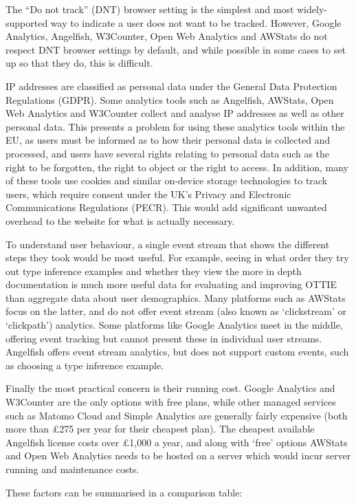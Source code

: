 \documentclass[a4paper,fleqn,oneside,12pt]{report}
\begin{document}
The ``Do not track'' (DNT) browser setting is the simplest and most widely-supported way to indicate a user does not want to be tracked. However, Google Analytics, Angelfish, W3Counter, Open Web Analytics and AWStats do not respect DNT browser settings by default, and while possible in some cases to set up so that they do, this is difficult.

IP addresses are classified as personal data under the General Data Protection Regulations (GDPR). Some analytics tools such as Angelfish, AWStats, Open Web Analytics and W3Counter collect and analyse IP addresses as well as other personal data. This presents a problem for using these analytics tools within the EU, as users must be informed as to how their personal data is collected and processed, and users have several rights relating to personal data such as the right to be forgotten, the right to object or the right to access. In addition, many of these tools use cookies and similar on-device storage technologies to track users, which require consent under the UK’s Privacy and Electronic Communications Regulations (PECR). This would add significant unwanted overhead to the website for what is actually necessary.

To understand user behaviour, a single event stream that shows the different steps they took would be most useful. For example, seeing in what order they try out type inference examples and whether they view the more in depth documentation is much more useful data for evaluating and improving OTTIE than aggregate data about user demographics. Many platforms such as AWStats focus on the latter, and do not offer event stream (also known as `clickstream' or `clickpath') analytics. Some platforms like Google Analytics meet in the middle, offering event tracking but cannot present these in individual user streams. Angelfish offers event stream analytics, but does not support custom events, such as choosing a type inference example.

Finally the most practical concern is their running cost. Google Analytics and W3Counter are the only options with free plans, while other managed services such as Matomo Cloud and Simple Analytics are generally fairly expensive (both more than £275 per year for their cheapest plan). The cheapest available Angelfish license costs over £1,000 a year, and along with `free' options AWStats and Open Web Analytics needs to be hosted on a server which would incur server running and maintenance costs.

These factors can be summarised in a comparison table:
\end{document}

